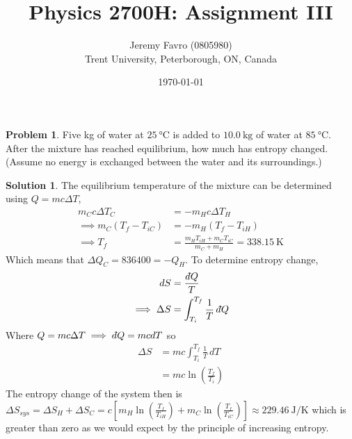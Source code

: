 \documentclass[10pt]{article}
\title{Physics 2700H: Assignment III}
\author{Jeremy Favro (0805980) \\ Trent University, Peterborough, ON, Canada}
\date{\today}
\theoremstyle{definition}
\newtheorem{problem}{Problem}
\newtheorem{soln}{Solution}
\newcommand{\dbar}{d\hspace*{-0.08em}\bar{}\hspace*{0.1em}}
\begin{document}
\maketitle

\begin{problem}
Five kg of water at $\qty{25}{\degreeCelsius}$ is added to $\qty{10.0}{\kilo\gram}$ of water at $\qty{85}{\degreeCelsius}$.
After the mixture has reached equilibrium, how much has entropy changed. (Assume no energy is exchanged between the water and its surroundings.)
\end{problem}
\begin{soln}
  The equilibrium temperature of the mixture can be determined using $Q=mc\Delta T$,
  \begin{align*}
    m_Cc\Delta T_C                      & =-m_Hc\Delta T_H                                           \\
    \implies m_C\left(T_f-T_{iC}\right) & =-m_H\left(T_f-T_{iH}\right)                               \\
    \implies T_f                        & =\frac{m_HT_{iH}+m_CT_{iC}}{m_C+m_H}=\qty{338.15}{\kelvin}
  \end{align*}
  Which means that $\Delta Q_C=836400=-Q_H$. To determine entropy change,
  \begin{align*}
    dS                & = \frac{\dbar Q}{T}                   \\
    \implies \Delta S & =\int_{T_i}^{T_f}\frac{1}{T}\,\dbar Q
  \end{align*}
  Where $Q=mc\Delta T\implies \dbar Q=mcdT$ so
  \begin{align*}
    \Delta S & =mc\int_{T_i}^{T_f}\frac{1}{T}\,dT \\
             & =mc\ln\left(\frac{T_f}{T_i}\right)
  \end{align*}
  The entropy change of the system then is
  $\Delta S_{sys}=\Delta S_H +\Delta S_C=c\left[m_H\ln\left(\frac{T_f}{T_{iH}}\right)+m_C\ln\left(\frac{T_f}{T_{iC}}\right)\right]\approx \qty{229.46}{\joule\per\kelvin}$
  which is greater than zero as we would expect by the principle of increasing entropy.
\end{soln}
\newpage
\end{document}

